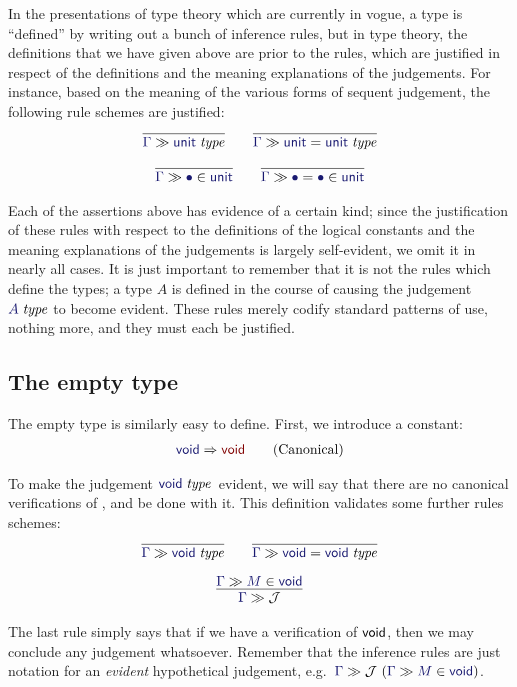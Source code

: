 \documentclass[main.tex]{subfiles}
\begin{document}
In the presentations of type theory which are currently in vogue, a type is
``defined'' by writing out a bunch of inference rules, but in type theory, the
definitions that we have given above are prior to the rules, which are
justified in respect of the definitions and the meaning explanations of the
judgements. For instance, based on the meaning of the various forms of sequent
judgement, the following rule schemes are justified:
\begin{gather*}
  \infer{
    \sequent\Gamma\isset\tyunit
  }{
  }\qquad
  \infer{
    \sequent\Gamma\eisset{\tyunit}{\tyunit}
  }{
  }\\[6pt]
  \infer{
    \sequent\Gamma\ver\bullet\tyunit
  }{
  }\qquad
  \infer{
    \sequent\Gamma\ever{\bullet}{\bullet}{\tyunit}
  }{
  }
\end{gather*}

Each of the assertions above has evidence of a certain kind; since the
justification of these rules with respect to the definitions of the logical
constants and the meaning explanations of the judgements is largely
self-evident, we omit it in nearly all cases. It is just important to remember
that it is not the rules which define the types; a type $A$ is defined in the
course of causing the judgement $\isset{A}$ to become evident.  These rules
merely codify standard patterns of use, nothing more, and they must each be
justified.

\subsection{The empty type}

The empty type is similarly easy to define. First, we introduce a constant:
\begin{gather*}
  \reduce\tyvoid\tyvoid\tag{Canonical}
\end{gather*}

To make the judgement $\isset\tyvoid$\ evident, we will say that there are no
canonical verifications of \tyvoid, and be done with it. This definition
validates some further rules schemes:
\begin{gather*}
  \infer{
    \sequent\Gamma\isset\tyvoid
  }{
  }\qquad
  \infer{
    \sequent\Gamma\eisset{\tyvoid}{\tyvoid}
  }{
  }\\[6pt]
  \infer{
    \sequent\Gamma\mathcal{J}
  }{
    \sequent\Gamma\ver{M}{\tyvoid}
  }
\end{gather*}

The last rule simply says that if we have a verification of $\mathsf{void}$, then we
may conclude any judgement whatsoever. Remember that the inference rules are
just notation for an \emph{evident} hypothetical judgement, e.g.\
$\hyp{\sequent{\Gamma}\mathcal{J}}{\sequent\Gamma\ver{M}{\tyvoid}}$.
\end{document}
